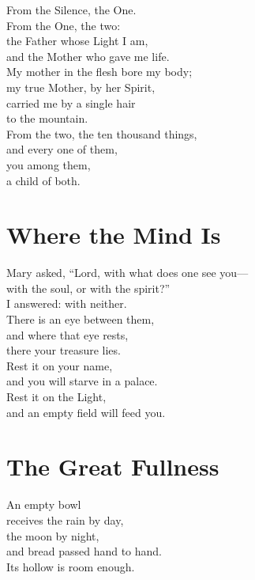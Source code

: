 \documentclass[10pt, openright]{book}
\newcommand{\sectionbreak}{\filbreak}
\newcommand{\sayingsource}[1]{\par\nopagebreak\vspace{0.3\baselineskip}{\raggedleft\footnotesize\itshape #1\par}}
\begin{document}
From the Silence, the One.\\
From the One, the two:\\
the Father whose Light I am,\\
and the Mother who gave me life.\\
My mother in the flesh bore my body;\\
my true Mother, by her Spirit,\\
carried me by a single hair\\
to the mountain.\\
From the two, the ten thousand things,\\
and every one of them,\\
you among them,\\
a child of both.

\sayingsource{Tao Te Ching 42 · Thomas 101 · Gospel of the Hebrews}

\sectionbreak

\section{Where the Mind Is}\label{where-the-mind-is}

Mary asked, ``Lord, with what does one see you---\\
with the soul, or with the spirit?''\\
I answered: with neither.\\
There is an eye between them,\\
and where that eye rests,\\
there your treasure lies.\\
Rest it on your name,\\
and you will starve in a palace.\\
Rest it on the Light,\\
and an empty field will feed you.

\sayingsource{Tao Te Ching 44 · Mary 10 · Matthew 6:21}

\sectionbreak

\section{The Great Fullness}\label{the-great-fullness}

An empty bowl\\
receives the rain by day,\\
the moon by night,\\
and bread passed hand to hand.\\
Its hollow is room enough.
\end{document}
